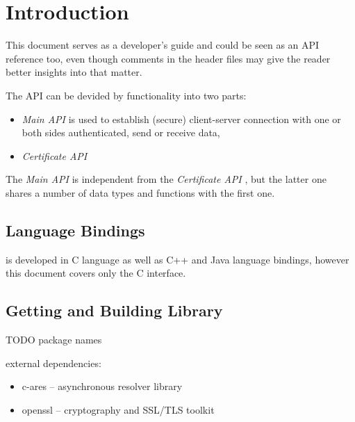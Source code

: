 %
%

\section{Introduction}

This document serves as a developer's guide and could be
seen as an API reference too, even though comments in
the header files may give the reader better insights into that matter.

The \CANL API can be devided by functionality into two parts:

\begin{itemize}
\item \textit{\CANL Main API} is used to establish (secure) client-server
connection with one or both sides authenticated, send or receive data,
\item \textit{\CANL Certificate API}
\end{itemize}
The \textit{Main API} is independent from the \textit{Certificate API}
, but the latter
one shares a number of data types and functions with the first one.

\subsection{Language Bindings}
\CANL is developed in C language as well as C++ and Java language bindings,
however this document covers only the C interface.

\subsection{Getting and Building Library}
TODO package names

external dependencies:
\begin{itemize}
\item c-ares -- asynchronous resolver library
\item openssl -- cryptography and SSL/TLS toolkit
\end{itemize}

